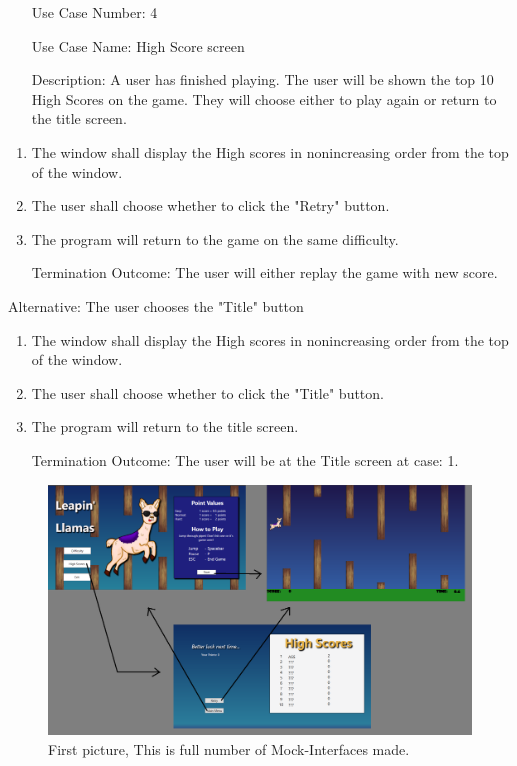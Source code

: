 \documentclass[10pt,conference,onecolumn,compsoc]{IEEEtran}
\begin{document}
\begin{itemize}
\item[Use Case Number:] 4
\item[Use Case Name:] High Score screen
\item[Description:] A user has finished playing. The user will be shown the top 10 High Scores on the game. They will choose either to play again or return to the title screen.

\end{itemize}

\begin{enumerate}
\item The window shall display the High scores in nonincreasing order from the top of the window.
\item The user shall choose whether to click the "Retry" button.
\item The program will return to the game on the same difficulty.
\item[Termination Outcome:] The user will either replay the game with new score.
\end{enumerate}

Alternative: The user chooses the "Title" button
\begin{enumerate}
\item The window shall display the High scores in nonincreasing order from the top of the window.
\item The user shall choose whether to click the "Title" button.
\item The program will return to the title screen.
\item[Termination Outcome:] The user will be at the Title screen at case: 1. 
\end{enumerate}

\begin{center}
\begin{figure}[ht!]
\includegraphics[scale = 0.4]{Mockup.png}
\caption{First picture, This is full number of Mock-Interfaces made.}
\label{fig:mockup}
\end{figure}
\end{center}
\end{document}
